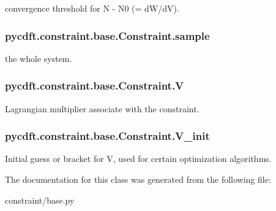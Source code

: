 convergence threshold for N -\/ N0 (= d\-W/d\-V). 

\hypertarget{classpycdft_1_1constraint_1_1base_1_1Constraint_afde90d6ecf3181a7def56d385f8d4343}{
\subsubsection[{sample}]{\setlength{\rightskip}{0pt plus 5cm}pycdft.\-constraint.\-base.\-Constraint.\-sample}}\label{classpycdft_1_1constraint_1_1base_1_1Constraint_afde90d6ecf3181a7def56d385f8d4343}


the whole system. 

\hypertarget{classpycdft_1_1constraint_1_1base_1_1Constraint_aa8ee88182fc2f1bd74bf5cafbedc11b4}{
\subsubsection[{V}]{\setlength{\rightskip}{0pt plus 5cm}pycdft.\-constraint.\-base.\-Constraint.\-V}}\label{classpycdft_1_1constraint_1_1base_1_1Constraint_aa8ee88182fc2f1bd74bf5cafbedc11b4}


Lagrangian multiplier associate with the constraint. 

\hypertarget{classpycdft_1_1constraint_1_1base_1_1Constraint_a10702275a9ba0a31ac92595d64099d08}{
\subsubsection[{V\-\_\-init}]{\setlength{\rightskip}{0pt plus 5cm}pycdft.\-constraint.\-base.\-Constraint.\-V\-\_\-init}}\label{classpycdft_1_1constraint_1_1base_1_1Constraint_a10702275a9ba0a31ac92595d64099d08}


Initial guess or bracket for V, used for certain optimization algorithms. 



The documentation for this class was generated from the following file\-:\begin{DoxyCompactItemize}
\item 
constraint/base.\-py\end{DoxyCompactItemize}
